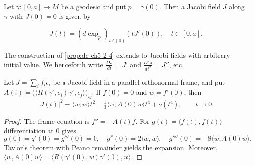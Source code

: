\begin{corollary}
  \label{cor:dc-ch5-2-5}
  \leanok
  Let $\gamma:[0,a]\to M$ be a geodesic and put $p=\gamma(0)$. Then a Jacobi field
  $J$ along $\gamma$ with $J(0)=0$ is given by

  $$
  J(t)=(d\exp_p)_{t\gamma'(0)}(tJ'(0)),\quad t\in[0,a].
  $$

\end{corollary}

\begin{remark}
  \label{rem:dc-ch5-2-6}
  The construction of \cref{prop:dc-ch5-2-4} extends to Jacobi fields with
  arbitrary initial value. We henceforth write $\frac{DJ}{dt}=J'$ and
  $\frac{D^2 J}{dt^2}=J''$, etc.
\end{remark}

\begin{lemma}
  \label{lem:dc-ch5-2-7-taylor-ode}
  \leanok
  Let $J=\sum_i f_i e_i$ be a Jacobi field in a parallel orthonormal frame,
  and put
  $A(t)=\big(\langle R(\gamma',e_i)\gamma',e_j\rangle\big)_{ij}$.
  If $f(0)=0$ and $w=f'(0)$, then
  $$
  |J(t)|^2=\langle w,w\rangle t^2
  -\tfrac13\langle w,A(0)w\rangle t^4+o(t^4),\qquad t\to0.
  $$
\end{lemma}
\begin{proof}

  \sketch
  The frame equation is $f''=-A(t)f$. For
  $g(t)=\langle f(t),f(t)\rangle$, differentiation at $0$ gives
  $$
  g(0)=g'(0)=g'''(0)=0,\quad
  g''(0)=2\langle w,w\rangle,\quad
  g''''(0)=-8\langle w,A(0)w\rangle.
  $$
  Taylor's theorem with Peano remainder yields the expansion. Moreover,
  $\langle w,A(0)w\rangle
  =\langle R(\gamma'(0),w)\gamma'(0),w\rangle$.
\end{proof}

